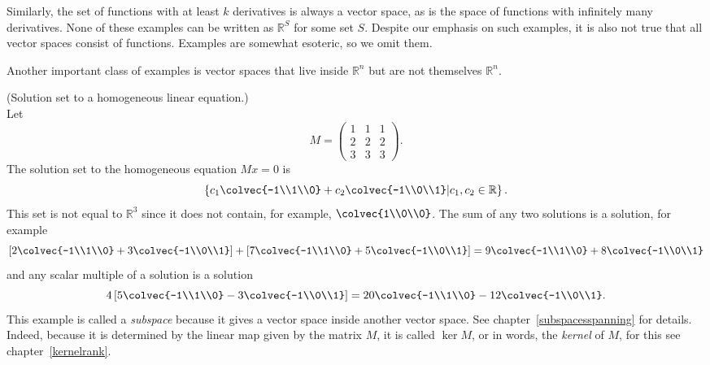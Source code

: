 Similarly, the set of functions with at least $k$ derivatives is always a vector space, as is the space of functions with infinitely many derivatives. 
None of these examples can be written as $\mathbb{R}^S$ for some set $S$.
Despite our emphasis on such examples, it is also not true that all vector spaces consist of functions. Examples are somewhat esoteric, so we omit them.

Another important class of examples is vector spaces that live inside $\mathbb{R}^n$ but are not themselves $\mathbb{R}^n$. 

\begin{example} (Solution set to a homogeneous linear equation.)\\
Let 
\[ M = \begin{pmatrix}
      1 & 1 &1 \\
      2&2&2 \\
      3&3&3
    \end{pmatrix}.\]
    The solution set to the homogeneous equation $Mx=0$ is 
\[\left\{ c_1\colvec{-1\\1\\0} + c_2 \colvec{-1\\0\\1} \middle\vert c_1,c_2\in \mathbb{R} \right\}.\]
    This set is not equal to $\mathbb{R}^3$ since it does not contain, for example,  $\colvec{1\\0\\0}$. 
The sum of any two solutions is a solution, for example 
\[
    \left[ 2\colvec{-1\\1\\0} + 3 \colvec{-1\\0\\1} \right] 
+ \left [ 7\colvec{-1\\1\\0} + 5 \colvec{-1\\0\\1} \right]
=
 9\colvec{-1\\1\\0} + 8 \colvec{-1\\0\\1} 
\]
and any scalar multiple of a solution is a solution
\[
4\left[ 5\colvec{-1\\1\\0} - 3 \colvec{-1\\0\\1} \right]
=      20\colvec{-1\\1\\0} - 12 \colvec{-1\\0\\1} . 
\]
This example is called a {\itshape subspace} because it gives a vector space inside another vector space. See chapter~\ref{subspacesspanning}
for details. Indeed, because it is determined by the linear map given by the matrix $M$, it is called $\ker M$, or in words, the {\itshape kernel} of $M$,
for this see chapter~\ref{kernelrank}. 
\end{example}

